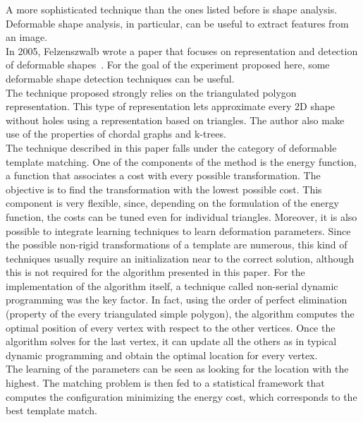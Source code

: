 \documentclass[conference]{IEEEtran}
\begin{document}
					A more sophisticated technique than the ones listed before is shape analysis. Deformable shape analysis, in particular, can be useful to extract features from an image.\\
					In 2005, Felzenszwalb wrote a paper that focuses on representation and detection of deformable shapes~\cite{felzenszwalb2005representation}. For the goal of the experiment proposed here, some deformable shape 
					detection techniques can be useful. \\
					The technique proposed strongly relies on the triangulated polygon representation. This type of representation lets approximate every 2D shape without holes using a representation based on triangles. 
					The author also make use of the properties of chordal graphs and k-trees.\\
					The technique described in this paper falls under the category of deformable template matching. One of the components of the method is the energy function, a function that associates a cost with every 
					possible transformation. The objective is to find the transformation with the lowest possible cost. This component is very flexible, since, depending on the formulation of the energy function, the costs 
					can be tuned even for individual triangles. Moreover, it is also possible to integrate learning techniques to learn deformation parameters.
					Since the possible non-rigid transformations of a template are numerous, this kind of techniques usually require an initialization near to the correct solution, 
					although this is not required for the algorithm presented in this paper. 
					For the implementation of the algorithm itself, a technique called non-serial dynamic programming was the key factor. In fact, using the order of perfect elimination (property of the every triangulated 
					simple polygon), the algorithm computes the optimal position of every vertex with respect to the other vertices. Once the algorithm solves for the last vertex, it can 
					update all the others as in typical dynamic programming and obtain the optimal location for every vertex.\\
					The learning of the parameters can be seen as looking for the location with the highest. The matching problem is then fed to a statistical framework that computes the configuration minimizing the 
					energy cost, which corresponds to the best template match.
					
\end{document}
